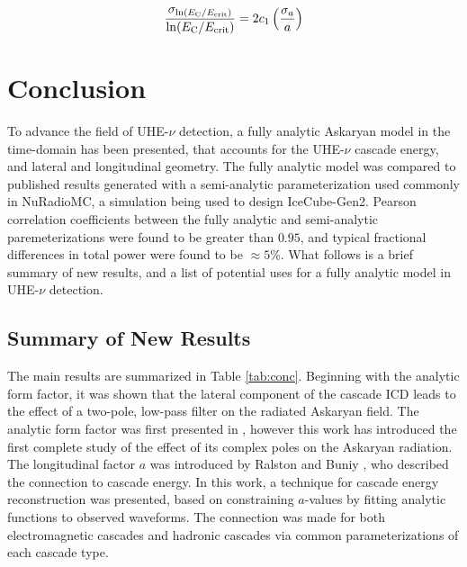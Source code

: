 \documentclass[amsmath,amssymb,aps,prd,10pt,twocolumn]{revtex4}
\begin{document}
\begin{equation}
\frac{\sigma_{\ln(E_{\rm C}/E_{\rm crit})}}{\ln(E_{\rm C}/E_{\rm crit})} = 2 c_1 \left( \frac{\sigma_a}{a}\right) \label{eq:energy}
\end{equation}

\section{Conclusion}
\label{sec:conc}

To advance the field of UHE-$\nu$ detection, a fully analytic Askaryan model in the time-domain has been presented, that accounts for the UHE-$\nu$ cascade energy, and lateral and longitudinal geometry.  The fully analytic model was compared to published results generated with a semi-analytic parameterization used commonly in NuRadioMC, a simulation being used to design IceCube-Gen2.  Pearson correlation coefficients between the fully analytic and semi-analytic paremeterizations were found to be greater than $0.95$, and typical fractional differences in total power were found to be $\approx 5$\%.  What follows is a brief summary of new results, and a list of potential uses for a fully analytic model in UHE-$\nu$ detection.

\subsection{Summary of New Results}

The main results are summarized in Table \ref{tab:conc}.  Beginning with the analytic form factor, it was shown that the lateral component of the cascade ICD leads to the effect of a two-pole, low-pass filter on the radiated Askaryan field.  The analytic form factor was first presented in \cite{10.1016/j.astropartphys.2017.03.008}, however this work has introduced the first complete study of the effect of its complex poles on the Askaryan radiation.  The longitudinal factor $a$ was introduced by Ralston and Buniy \cite{10.1103/physrevd.65.016003}, who described the connection to cascade energy.  In this work, a technique for cascade energy reconstruction was presented, based on constraining $a$-values by fitting analytic functions to observed waveforms.  The connection was made for both electromagnetic cascades and hadronic cascades via common parameterizations of each cascade type.
\end{document}
